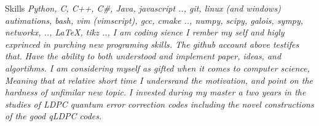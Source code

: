 
\begin{rubric}{Skills}
  \entry*[Coding]
  \emph{Python, C, C++, C\#, Java, javascript .., git, linux (and windows) autimations, bash, vim (vimscript), gcc, cmake .., numpy, scipy, galois, sympy, networkx, .., \LaTeX, tikz .., I am coding sience I rember my self and higly exprinced in purching new programing skills. The github account above testifes that.}  
  \entry*[Theortical] 
  \emph{Have the ability to both understood and implement paper, ideas, and algortihms. I am considering myself as gifted when it comes to computer science, Meaning that at relative short time I undersrand the motivation, and point on the hardness of unfimilar new topic. }
  \entry*[Mastring.]
  \emph{I invested during my master a two years in the studies of LDPC quantum error correction codes including the novel constructions of the good qLDPC codes. }
\end{rubric}
